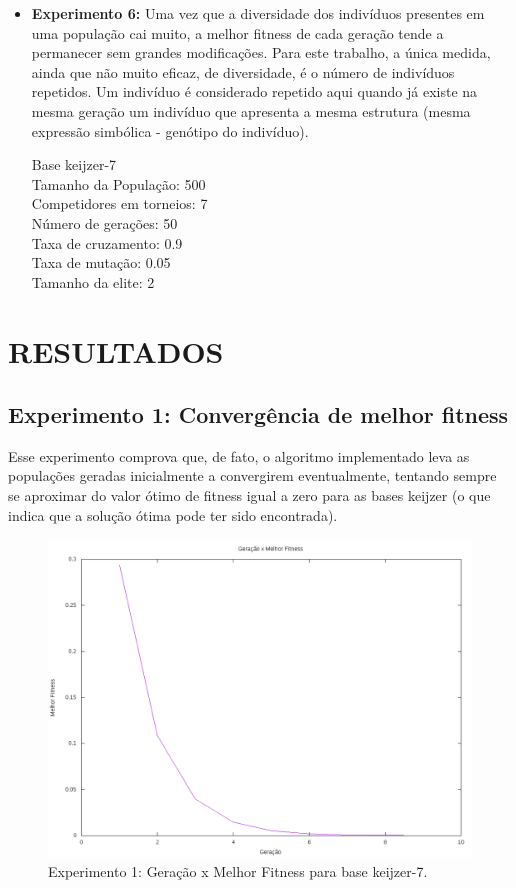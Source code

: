 \documentclass[12pt]{article}
\begin{document}
\begin{itemize}
 \item \textbf{Experimento 6:} Uma vez que a diversidade dos indivíduos presentes em uma população
 cai muito, a melhor fitness de cada geração tende a permanecer sem grandes modificações. Para este
 trabalho, a única medida, ainda que não muito eficaz, de diversidade, é o número de indivíduos
 repetidos. Um indivíduo é considerado repetido aqui quando já existe na mesma geração um indivíduo
 que apresenta a mesma estrutura (mesma expressão simbólica - genótipo do indivíduo).
 
 Base keijzer-7 \\
 Tamanho da População: 500 \\
 Competidores em torneios: 7 \\
 Número de gerações: 50 \\
 Taxa de cruzamento: 0.9 \\ 
 Taxa de mutação: 0.05 \\
 Tamanho da elite: 2 \\
 
\end{itemize}


\section{RESULTADOS} \label{sec:result}

\subsection{Experimento 1: Convergência de melhor fitness}

Esse experimento comprova que, de fato, o algoritmo implementado leva as populações
geradas inicialmente a convergirem eventualmente, tentando sempre se aproximar do valor
ótimo de fitness igual a zero para as bases keijzer (o que indica que a solução ótima
pode ter sido encontrada).

\begin{figure}[ht]
  \centering
  \includegraphics[width=1\textwidth]{exp1k7.png}
  \caption{Experimento 1: Geração x Melhor Fitness para base keijzer-7.}
  \label{fig:exp1k7}
\end{figure}
\end{document}
